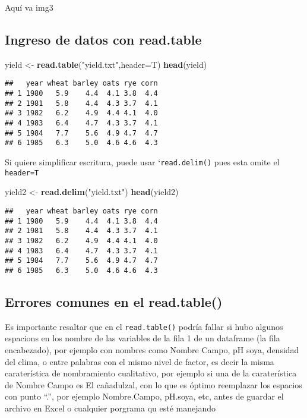 \documentclass[]{article}
\newenvironment{Shaded}{\begin{snugshade}}{\end{snugshade}}
\newcommand{\KeywordTok}[1]{\textcolor[rgb]{0.13,0.29,0.53}{\textbf{#1}}}
\newcommand{\DataTypeTok}[1]{\textcolor[rgb]{0.13,0.29,0.53}{#1}}
\newcommand{\StringTok}[1]{\textcolor[rgb]{0.31,0.60,0.02}{#1}}
\newcommand{\NormalTok}[1]{#1}
\begin{document}
Aquí va img3

\subsection{Ingreso de datos con
read.table}\label{ingreso-de-datos-con-read.table}

\begin{Shaded}
\begin{Highlighting}[]
\NormalTok{yield <-}\StringTok{ }\KeywordTok{read.table}\NormalTok{(}\StringTok{"yield.txt"}\NormalTok{,}\DataTypeTok{header=}\NormalTok{T)}
\KeywordTok{head}\NormalTok{(yield)}
\end{Highlighting}
\end{Shaded}

\begin{verbatim}
##   year wheat barley oats rye corn
## 1 1980   5.9    4.4  4.1 3.8  4.4
## 2 1981   5.8    4.4  4.3 3.7  4.1
## 3 1982   6.2    4.9  4.4 4.1  4.0
## 4 1983   6.4    4.7  4.3 3.7  4.1
## 5 1984   7.7    5.6  4.9 4.7  4.7
## 6 1985   6.3    5.0  4.6 4.6  4.3
\end{verbatim}

Si quiere simplificar escritura, puede usar `\texttt{read.delim()} pues
esta omite el \texttt{header=T}

\begin{Shaded}
\begin{Highlighting}[]
\NormalTok{yield2 <-}\StringTok{ }\KeywordTok{read.delim}\NormalTok{(}\StringTok{"yield.txt"}\NormalTok{)}
\KeywordTok{head}\NormalTok{(yield2)}
\end{Highlighting}
\end{Shaded}

\begin{verbatim}
##   year wheat barley oats rye corn
## 1 1980   5.9    4.4  4.1 3.8  4.4
## 2 1981   5.8    4.4  4.3 3.7  4.1
## 3 1982   6.2    4.9  4.4 4.1  4.0
## 4 1983   6.4    4.7  4.3 3.7  4.1
## 5 1984   7.7    5.6  4.9 4.7  4.7
## 6 1985   6.3    5.0  4.6 4.6  4.3
\end{verbatim}

\subsection{Errores comunes en el
read.table()}\label{errores-comunes-en-el-read.table}

Es importante resaltar que en el \texttt{read.table()} podría fallar si
hubo algunos espacions en los nombre de las variables de la fila 1 de un
dataframe (la fila encabezado), por ejemplo con nombres como Nombre
Campo, pH soya, densidad del clima, o entre palabras con el mismo nivel
de factor, es decir la misma caraterística de nombramiento cualitativo,
por ejemplo si una de la caraterística de Nombre Campo es El cañadulzal,
con lo que es óptimo reemplazar los espacios con punto ``.'', por
ejemplo Nombre.Campo, pH.soya, etc, antes de guardar el archivo en Excel
o cualquier porgrama qu esté manejando
\end{document}
